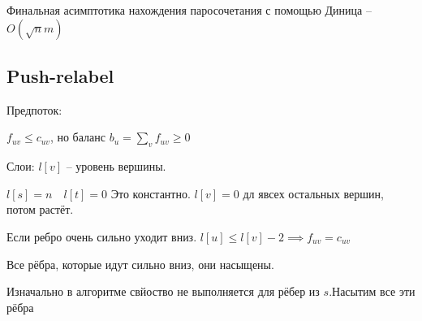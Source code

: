 Финальная асимптотика нахождения паросочетания с помощью Диница -- $O(\sqrt{n}m)$

\subsection{Push-relabel}

\begin{definition}
    Предпоток: 
    
    $f_{uv} \leqslant c_{uv}$, но баланс $b_u = \sum_v f_{uv} \geqslant 0$

    Слои: $l[v] $ -- уровень вершины.

    $l[s] = n\quad l[t] = 0$ Это константно. $l[v] = 0$ дл явсех остальных вершин, потом растёт.
\end{definition}

\begin{property}
    Если ребро очень сильно уходит вниз. $l[u] \leqslant l[v] -2 \implies f_{uv} = c_{uv}$

    Все рёбра, которые идут сильно вниз, они насыщены.
\end{property}

Изначально в алгоритме свйоство не выполняется для рёбер из $s$.Насытим все эти рёбра

